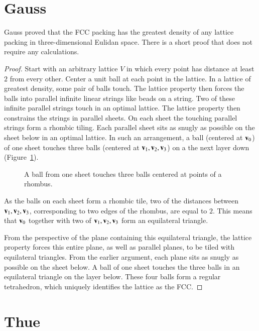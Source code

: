 \section{Gauss}

Gauss proved that the FCC packing has the greatest density
of any lattice packing in three-dimensional Eulidan space.  There is a
short proof that does not require any calculations.

\begin{proof}
Start with an arbitrary lattice $V$ in which every point has distance 
at least $2$ from every other.  Center a unit ball at each point in
the lattice.  In a lattice of greatest density, some pair of balls
touch.  The lattice property then forces the balls into parallel
infinite linear strings like beads on a string.  Two of these infinite
parallel strings touch in an optimal lattice.  The
lattice property then constrains the strings in parallel sheets.  On
each sheet the touching parallel strings form a rhombic tiling.  Each
parallel sheet sits as snugly as possible on the sheet below in an optimal
lattice.  In such an arrangement, a ball (centered at
${\mathbf v}_0$) of one sheet touches three balls (centered at
${\mathbf v}_1,{\mathbf v}_2,{\mathbf v}_3$) on a the next layer down (Figure~\ref{fig:rhombus}).

\begin{figure}[htb]
  \centering
  \caption{A ball from one sheet touches three balls centered at points of a rhombus.}
  \label{fig:rhombus}
\end{figure}

As the balls on each sheet form a rhombic tile, two of the distances
between ${\mathbf v}_1,{\mathbf v}_2,{\mathbf v}_3$, corresponding to two edges of the rhombus, are
equal to $2$.  This means that ${\mathbf v}_0$ together with two of
${\mathbf v}_1,{\mathbf v}_2,{\mathbf v}_3$ form an equilateral triangle.  

From the perspective of
the plane containing this equilateral triangle, the lattice property
forces this entire plane, as well as parallel planes, to be tiled with
equilateral triangles.  From the earlier argument, each plane sits as
snugly as possible on the sheet below.  A ball of one sheet touches
the three balls in an equilateral triangle on the layer below.
These four balls form a regular tetrahedron, which
uniquely identifies the lattice as the FCC.
\end{proof}






\section{Thue}\label{sec:thue}


